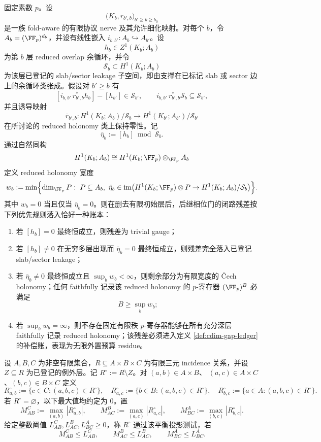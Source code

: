 \begin{theorem}\label{distill:cech_cohomology-holonomy_residue_classification-cdim-gap-holonomy-width-ledger}
固定素数 \(p\)。设
\[
\bigl(K_b,r_{b',b}\bigr)_{b'\ge b\ge b_0}
\]
是一族 fold-aware 的有限协议 nerve 及其允许细化映射。对每个 \(b\)，令 \(A_b=(\FF_p)^{d_b}\)，并设有线性嵌入 \(i_{b,b'}:A_b\hookrightarrow A_{b'}\)。设
\[
h_b\in Z^1(K_b;A_b)
\]
为第 \(b\) 层 reduced overlap 余循环，并令
\[
\mathcal S_b\subset H^1(K_b;A_b)
\]
为该层已登记的 slab/sector leakage 子空间，即由支撑在已标记 slab 或 sector 边上的余循环类张成。假设对 \(b'\ge b\) 有
\[
[i_{b,b'}\,r_{b',b}^{\ast}h_b]-[h_{b'}]\in \mathcal S_{b'},
\qquad
 i_{b,b'}\,r_{b',b}^{\ast}\mathcal S_b\subseteq\mathcal S_{b'},
\]
并且诱导映射
\[
\overline r_{b',b}:
H^1(K_b;A_b)/\mathcal S_b
\longrightarrow
H^1(K_{b'};A_{b'})/\mathcal S_{b'}
\]
在所讨论的 reduced holonomy 类上保持零性。记
\[
\bar\eta_b:=[h_b]\bmod \mathcal S_b.
\]
通过自然同构
\[
H^1(K_b;A_b)\cong H^1(K_b;\FF_p)\otimes_{\FF_p} A_b
\]
定义 reduced holonomy 宽度
\[
w_b:=\min\Bigl\{\dim_{\FF_p}P:\ P\subseteq A_b,
\ \bar\eta_b\in \operatorname{im}\bigl(H^1(K_b;\FF_p)\otimes P\to H^1(K_b;A_b)/\mathcal S_b\bigr)\Bigr\}.
\]
其中 \(w_b=0\) 当且仅当 \(\bar\eta_b=0\)。则在删去有限初始层后，后继相位门的闭路残差按下列优先规则落入恰好一种账本：
\begin{enumerate}
  \item 若 \([h_b]=0\) 最终恒成立，则残差为 trivial gauge；
  \item 若 \([h_b]\ne0\) 在无穷多层出现而 \(\bar\eta_b=0\) 最终恒成立，则残差完全落入已登记 slab/sector leakage；
  \item 若 \(\bar\eta_b\ne0\) 最终恒成立且 \(\sup_b w_b<\infty\)，则剩余部分为有限宽度的 \v Cech holonomy；任何 faithfully 记录该 reduced holonomy 的 \(p\)-寄存器 \((\FF_p)^B\) 必满足
  \[
  B\ge \sup_b w_b;
  \]
  \item 若 \(\sup_b w_b=\infty\)，则不存在固定有限秩 \(p\)-寄存器能够在所有充分深层 faithfully 记录 reduced holonomy；该残差必须进入定义 \ref{def:cdim-gap-ledger} 的补偿账，表现为无限外置预算 residue。
\end{enumerate}
\end{theorem}
\begin{definition}\label{def:distill-cdim-balanced-ternary-incidence-ledger}
设 \(A,B,C\) 为非空有限集合，\(R\subseteq A\times B\times C\) 为有限三元 incidence 关系，并设
\(Z\subseteq R\) 为已登记的例外层。记 \(R^\circ:=R\setminus Z\)。对 \((a,b)\in A\times B\)、
\((a,c)\in A\times C\)、\((b,c)\in B\times C\) 定义
\[
R^\circ_{a,b}:=\{c\in C:(a,b,c)\in R^\circ\},\quad
R^\circ_{a,c}:=\{b\in B:(a,b,c)\in R^\circ\},\quad
R^\circ_{b,c}:=\{a\in A:(a,b,c)\in R^\circ\}.
\]
若 \(R^\circ=\varnothing\)，以下最大值均约定为 \(0\)。置
\[
M_{AB}^{C}:=\max_{(a,b)}|R^\circ_{a,b}|,\qquad
M_{AC}^{B}:=\max_{(a,c)}|R^\circ_{a,c}|,\qquad
M_{BC}^{A}:=\max_{(b,c)}|R^\circ_{b,c}|.
\]
给定整数阈值
\(L_{AB}^{C},L_{AC}^{B},L_{BC}^{A}\ge0\)，称 \(R^\circ\) 通过该平衡投影测试，若
\[
M_{AB}^{C}\le L_{AB}^{C},\qquad
M_{AC}^{B}\le L_{AC}^{B},\qquad
M_{BC}^{A}\le L_{BC}^{A}.
\]
\end{definition}

